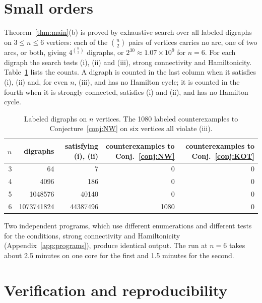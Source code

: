 \documentclass[11pt]{article}
\begin{document}
\section{Small orders}\label{sec:small}
Theorem~\ref{thm:main}(b) is proved by exhaustive search over all labeled digraphs on $3\le n\le6$ vertices: each of the $\binom n2$ pairs of vertices carries no arc, one of two arcs, or both, giving $4^{\binom n2}$ digraphs, or $2^{30}\approx1.07\times10^9$ for $n=6$. For each digraph the search tests (i), (ii) and (iii), strong connectivity and Hamiltonicity. Table~\ref{tab:small} lists the counts. A digraph is counted in the last column when it satisfies (i), (ii) and, for even $n$, (iii), and has no Hamilton cycle; it is counted in the fourth when it is strongly connected, satisfies (i) and (ii), and has no Hamilton cycle.

\begin{table}[ht]
\centering
\begin{tabular}{rrrrr}
$n$ & digraphs & satisfying (i), (ii) & counterexamples to Conj.~\ref{conj:NW} & counterexamples to Conj.~\ref{conj:KOT}\\\hline
3 & 64 & 7 & 0 & 0\\
4 & 4096 & 186 & 0 & 0\\
5 & 1048576 & 40140 & 0 & 0\\
6 & 1073741824 & 44387496 & 1080 & 0
\end{tabular}
\caption{Labeled digraphs on $n$ vertices. The 1080 labeled counterexamples to Conjecture~\ref{conj:NW} on six vertices all violate (iii).}\label{tab:small}
\end{table}

Two independent programs, which use different enumerations and different tests for the conditions, strong connectivity and Hamiltonicity (Appendix~\ref{app:programs}), produce identical output. The run at $n=6$ takes about 2.5 minutes on one core for the first and 1.5 minutes for the second.

\section{Verification and reproducibility}\label{sec:verification}
\end{document}

